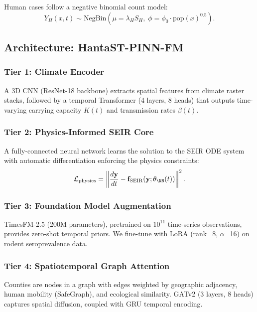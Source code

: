 \documentclass[11pt,a4paper]{article}
\newcommand{\SEIR}{\text{SEIR}}
\begin{document}
Human cases follow a negative binomial count model:
\begin{equation}
Y_H(x,t) \sim \text{NegBin}\left(\mu = \lambda_H S_H, \; \phi = \phi_0 \cdot \text{pop}(x)^{0.5}\right).
\end{equation}

\subsection{Architecture: HantaST-PINN-FM}

\subsubsection{Tier 1: Climate Encoder}

A 3D CNN (ResNet-18 backbone) extracts spatial features from climate raster stacks, followed by a temporal Transformer (4 layers, 8 heads) that outputs time-varying carrying capacity $K(t)$ and transmission rates $\beta(t)$.

\subsubsection{Tier 2: Physics-Informed SEIR Core}

A fully-connected neural network learns the solution to the SEIR ODE system with automatic differentiation enforcing the physics constraints:
\begin{equation}
\mathcal{L}_{\text{physics}} = \left\| \frac{d\mathbf{y}}{dt} - \mathbf{f}_{\SEIR}(\mathbf{y}; \theta_{\NN}(t)) \right\|^2.
\end{equation}

\subsubsection{Tier 3: Foundation Model Augmentation}

TimesFM-2.5 (200M parameters), pretrained on $10^{11}$ time-series observations, provides zero-shot temporal priors. We fine-tune with LoRA (rank=8, $\alpha$=16) on rodent seroprevalence data.

\subsubsection{Tier 4: Spatiotemporal Graph Attention}

Counties are nodes in a graph with edges weighted by geographic adjacency, human mobility (SafeGraph), and ecological similarity. GATv2 (3 layers, 8 heads) captures spatial diffusion, coupled with GRU temporal encoding.
\end{document}
